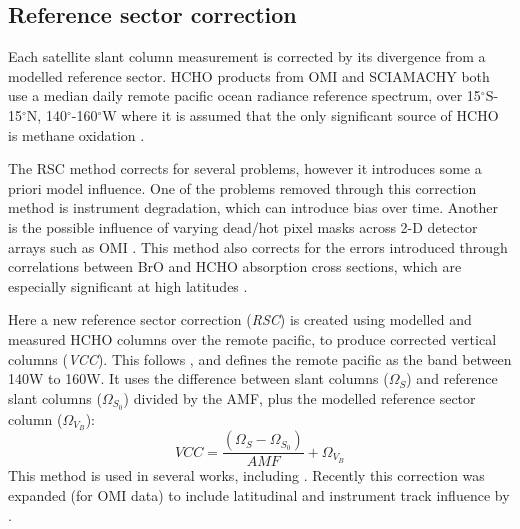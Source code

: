   \subsection{Reference sector correction}
    \label{Model:omiRecalc:RSC}
    Each satellite slant column measurement is corrected by its divergence from a modelled reference sector.
    HCHO products from OMI and SCIAMACHY both use a median daily remote pacific ocean radiance reference spectrum, over 15$^{\circ}$S-15$^{\circ}$N, 140$^{\circ}$-160$^{\circ}$W where it is assumed that the only significant source of HCHO is methane oxidation \parencite{DeSmedt2008,Barkley2013,Kurosu2014}.
    
    The RSC method corrects for several problems, however it introduces some a priori model influence.
    One of the problems removed through this correction method is instrument degradation, which can introduce bias over time.
    Another is the possible influence of varying dead/hot pixel masks across 2-D detector arrays such as OMI \parencite{DeSmedt2015}.
    This method also corrects for the errors introduced through correlations between BrO and HCHO absorption cross sections, which are especially significant at high latitudes \parencite{Abad2015}.
    
    Here a new reference sector correction (\textit{RSC}) is created using modelled and measured HCHO columns over the remote pacific, to produce corrected vertical columns (\textit{VCC}).
    This follows \textcite{Abad2016}, and defines the remote pacific as the band between 140{\degr}W to 160{\degr}W.
    It uses the difference between slant columns ($\Omega_S$) and reference slant columns ($\Omega_{S_0}$) divided by the AMF, plus the modelled reference sector column ($\Omega_{V_B}$):
    \begin{equation*}
      VCC = \frac{ \left( \Omega_S - \Omega_{S_0} \right) }{ AMF } + \Omega_{V_B}
    \end{equation*}
    This method is used in several works, including \textcite[e.g.,][]{DeSmedt2008, DeSmedt2012, DeSmedt2015, Barkley2013, Bauwens2016}.
    Recently this correction was expanded (for OMI data) to include latitudinal and instrument track influence by \textcite{Abad2015}.
    
